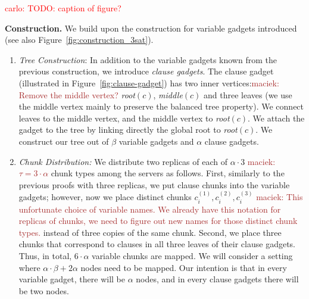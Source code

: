 \documentclass[9pt]{sigcomm-alternate}
\newcommand{\carlo}[1]{\textcolor{red}{carlo: #1}}
\newcommand{\maciek}[1]{\textcolor{brown}{maciek: #1}}
\newcommand{\clauses}{\alpha}
\newcommand{\vars}{\beta}
\begin{document}
\begin{appendix}
\carlo{TODO: caption of figure?}

\textbf{Construction.}
We build upon the construction for variable gadgets introduced (see also Figure~\ref{fig:construction_3sat}).

\begin{enumerate}
  \item \emph{Tree Construction}: In addition to the variable gadgets known from the
  previous construction, we introduce \emph{clause
    gadgets}. The clause gadget (illustrated in Figure~\ref{fig:clause-gadget})
    has two inner vertices:\maciek{Remove the middle vertex?}
    \emph{root}$(c)$, \emph{middle}$(c)$ and three leaves (we use the middle vertex mainly to
    preserve the balanced tree property). We connect leaves to the
    middle vertex, and the middle vertex to \emph{root}$(c)$. We attach the
    gadget to the tree by linking directly the global root to
    \emph{root}$(c)$. We construct our tree out of $\vars$ variable gadgets
    and $\clauses$ clause gadgets.
  \item \emph{Chunk Distribution:}
    We distribute two replicas of each of $\clauses \cdot 3$ \maciek{$\tau = 3 \cdot \clauses$} chunk types among the servers as follows.
    First, similarly to the
previous proofs with three replicas, we put clause chunks into the variable
gadgets; however, now we place distinct chunks $c^{(1)}_i, c^{(2)}_i, c^{(3)}_i$ \maciek{This unfortunate choice of variable names. We already have this notation for replicas of chunks, we need to figure out new names for those distinct chunk types.}
instead of three copies of the same chunk. Second, we place three
chunks that correspond to clauses in all three leaves of their clause
gadgets.  Thus, in total, $6 \cdot \clauses$ variable chunks are
mapped.  We will consider a setting where $\clauses \cdot \vars +
2\clauses$ nodes need to be mapped. Our intention is that in every
variable gadget, there will be $\clauses$ nodes, and in every clause
gadgets there will be two nodes.


\end{enumerate}
\end{appendix}
\end{document}
